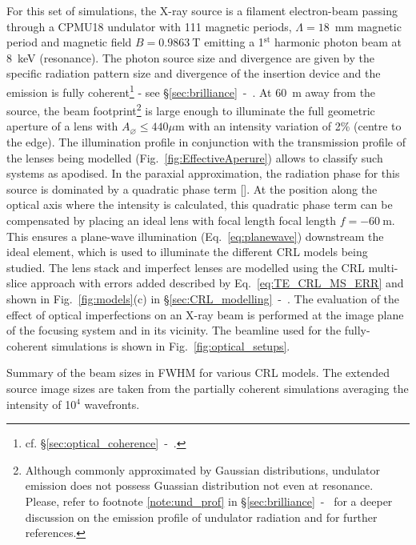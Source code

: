 \begin{refsection}
For this set of simulations, the X-ray source is a filament electron-beam passing through a CPMU18 undulator with 111 magnetic periods, $\Lambda=18$~mm magnetic period and magnetic field $B=0.9863~$T emitting a 1$^\text{st}$ harmonic photon beam at 8~keV (resonance). The photon source size and divergence are given by the specific radiation
pattern size and divergence of the insertion device and the emission is fully coherent\footnote{cf. \S\ref{sec:optical_coherence}~-~\textit{}.}  - see \S\ref{sec:brilliance}~-~\textit{}. At 60~m away from the source, the beam footprint\footnote{Although commonly approximated by Gaussian distributions, undulator emission does not possess Guassian distribution not even at resonance. Please, refer to footnote \ref{note:und_prof} in \S\ref{sec:brilliance}~-~\textit{} for a deeper discussion on the emission profile of undulator radiation and for further references.} is large enough to illuminate the full geometric aperture of a lens with $A_{\diameter}\le440 \mu\text{m}$ with an intensity variation of 2\% (centre to the edge). The illumination profile in conjunction with the transmission profile of the lenses being modelled (Fig.~\ref{fig:EffectiveAperure}) allows to classify such systems as apodised. In the paraxial approximation, the radiation phase for this source is dominated by a quadratic phase term [\cite{Chubar1999, Chubar2001b, Chubar2019}]. At the position along the optical axis where the intensity is calculated, this quadratic phase term can be compensated by placing an ideal lens with focal length focal length $f=-60~$m. This ensures a plane-wave illumination (Eq.~\ref{eq:planewave}) downstream the ideal element, which is used to illuminate the different CRL models being studied. The lens stack and imperfect lenses are modelled using the CRL multi-slice approach with errors added described by Eq.~\ref{eq:TE_CRL_MS_ERR} and shown in Fig.~\ref{fig:models}(c) in \S\ref{sec:CRL_modelling}~-~\textit{}. The evaluation of the effect of optical imperfections on an X-ray beam is performed at the image plane of the focusing system and in its vicinity. The beamline used for the fully-coherent simulations is shown in  Fig.~\ref{fig:optical_setups}.

\begin{table}[h]
\caption[FWHM of the PSF for the simulated models in Figs.~\ref{fig:CDn_vs_CDnStack}-\ref{fig:CDnS}]{Summary of the beam sizes in FWHM for various CRL models. The extended source image sizes are taken from the partially coherent simulations averaging the intensity of 10$^{4}$ wavefronts.}\label{tab:beamsizes}\small


\end{table}
\end{refsection}
